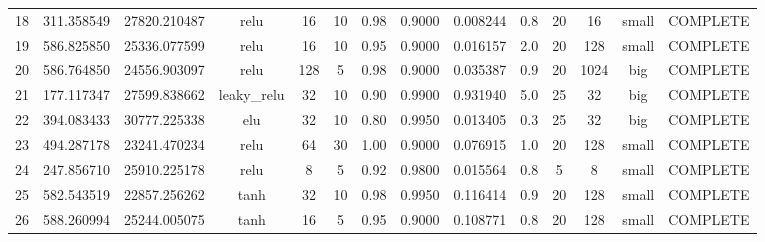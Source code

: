 \begin{longtable}{cccccccccccccc}
                       18 &                 311.358549 &                       27820.210487 &            relu &          16 &             10 &        0.98 & 0.9000 &       0.008244 &             0.8 &                 20 &       16 &     small & COMPLETE \\
                       19 &                 586.825850 &                       25336.077599 &            relu &          16 &             10 &        0.95 & 0.9000 &       0.016157 &             2.0 &                 20 &      128 &     small & COMPLETE \\
                       20 &                 586.764850 &                       24556.903097 &            relu &         128 &              5 &        0.98 & 0.9000 &       0.035387 &             0.9 &                 20 &     1024 &       big & COMPLETE \\
                       21 &                 177.117347 &                       27599.838662 &     leaky\_relu &          32 &             10 &        0.90 & 0.9900 &       0.931940 &             5.0 &                 25 &       32 &       big & COMPLETE \\
                       22 &                 394.083433 &                       30777.225338 &             elu &          32 &             10 &        0.80 & 0.9950 &       0.013405 &             0.3 &                 25 &       32 &       big & COMPLETE \\
                       23 &                 494.287178 &                       23241.470234 &            relu &          64 &             30 &        1.00 & 0.9000 &       0.076915 &             1.0 &                 20 &      128 &     small & COMPLETE \\
                       24 &                 247.856710 &                       25910.225178 &            relu &           8 &              5 &        0.92 & 0.9800 &       0.015564 &             0.8 &                  5 &        8 &     small & COMPLETE \\
                       25 &                 582.543519 &                       22857.256262 &            tanh &          32 &             10 &        0.98 & 0.9950 &       0.116414 &             0.9 &                 20 &      128 &     small & COMPLETE \\
                       26 &                 588.260994 &                       25244.005075 &            tanh &          16 &              5 &        0.95 & 0.9000 &       0.108771 &             0.8 &                 20 &      128 &     small & COMPLETE \\

\end{longtable}
